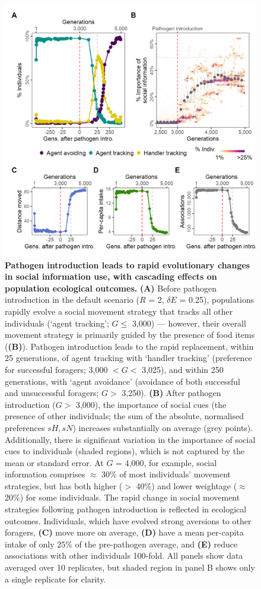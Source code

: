 \begin{figure}[!h]
    \centering
    \includegraphics[width=0.9\linewidth]{figures/pathomove/fig_01.png}
    \caption{
        \textbf{Pathogen introduction leads to rapid evolutionary changes in social information use, with cascading effects on population ecological outcomes.}
        \textbf{(A)} Before pathogen introduction in the default scenario ($R$ = 2, $\delta E$ = 0.25), populations rapidly evolve a social movement strategy that tracks all other individuals (`agent tracking'; $G \leq$ 3,000) --- however, their overall movement strategy is primarily guided by the presence of food items (\textbf{(B)}).
        Pathogen introduction leads to the rapid replacement, within 25 generations, of agent tracking with `handler tracking' (preference for successful foragers; 3,000 $< G <$ 3,025), and within 250 generations, with `agent avoidance' (avoidance of both successful and unsuccessful foragers; $G >$ 3,250).
        \textbf{(B)} After pathogen introduction ($G >$ 3,000), the importance of social cues (the presence of other individuals; the sum of the absolute, normalised preferences $sH, sN$) increases substantially on average (grey points).
        Additionally, there is significant variation in the importance of social cues to individuals (shaded regions), which is not captured by the mean or standard error.
        At $G$ = 4,000, for example, social information comprises $\approx$ 30\% of most individuals' movement strategies, but has both higher ($>$ 40\%) and lower weightage ($\approx$ 20\%) for some individuals.
        The rapid change in social movement strategies following pathogen introduction is reflected in ecological outcomes.
        Individuals, which have evolved strong aversions to other foragers, \textbf{(C)} move more on average, \textbf{(D)} have a mean per-capita intake of only 25\% of the pre-pathogen average, and \textbf{(E)} reduce associations with other individuals 100-fold.
        All panels show data averaged over 10 replicates, but shaded region in panel B shows only a single replicate for clarity.
    }
    \label{fig1}
\end{figure}

